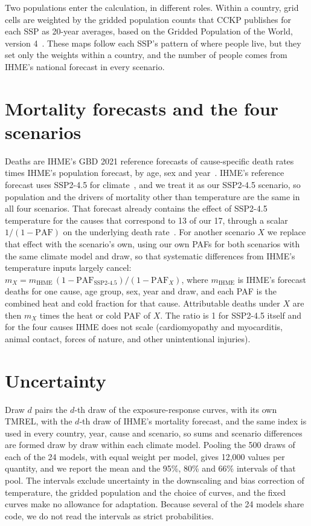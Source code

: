 \documentclass[11pt]{ozreport}
\begin{document}
Two populations enter the calculation, in different roles. Within a country, grid cells are weighted by the gridded population counts that CCKP publishes for each SSP as 20-year averages, based on the Gridded Population of the World, version 4~\cite{gpw4}. These maps follow each SSP's pattern of where people live, but they set only the weights within a country, and the number of people comes from IHME's national forecast in every scenario.

\section{Mortality forecasts and the four scenarios}

Deaths are IHME's GBD 2021 reference forecasts of cause-specific death rates times IHME's population forecast, by age, sex and year~\cite{gbd2021fc}. IHME's reference forecast uses SSP2-4.5 for climate~\cite{gbd2021fc}, and we treat it as our SSP2-4.5 scenario, so population and the drivers of mortality other than temperature are the same in all four scenarios. That forecast already contains the effect of SSP2-4.5 temperature for the causes that correspond to 13 of our 17, through a scalar $1/(1-\mathrm{PAF})$ on the underlying death rate~\cite{gbd2021fc}. For another scenario $X$ we replace that effect with the scenario's own, using our own PAFs for both scenarios with the same climate model and draw, so that systematic differences from IHME's temperature inputs largely cancel: $m_X = m_{\mathrm{IHME}}\,(1 - \mathrm{PAF}_{\mathrm{SSP2\text{-}4.5}})/(1 - \mathrm{PAF}_X)$, where $m_{\mathrm{IHME}}$ is IHME's forecast deaths for one cause, age group, sex, year and draw, and each PAF is the combined heat and cold fraction for that cause. Attributable deaths under $X$ are then $m_X$ times the heat or cold PAF of $X$. The ratio is 1 for SSP2-4.5 itself and for the four causes IHME does not scale (cardiomyopathy and myocarditis, animal contact, forces of nature, and other unintentional injuries).
\section{Uncertainty}

Draw $d$ pairs the $d$-th draw of the exposure-response curves, with its own TMREL, with the $d$-th draw of IHME's mortality forecast, and the same index is used in every country, year, cause and scenario, so sums and scenario differences are formed draw by draw within each climate model. Pooling the 500 draws of each of the 24 models, with equal weight per model, gives 12,000 values per quantity, and we report the mean and the 95\%, 80\% and 66\% intervals of that pool. The intervals exclude uncertainty in the downscaling and bias correction of temperature, the gridded population and the choice of curves, and the fixed curves make no allowance for adaptation. Because several of the 24 models share code, we do not read the intervals as strict probabilities.
\end{document}

